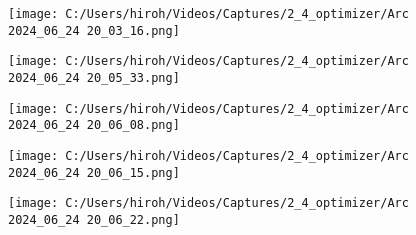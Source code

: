 \documentclass{ltjsarticle}
\begin{document}
\begin{figure}[htbp]
  \centering
  \texttt{[image: C:/Users/hiroh/Videos/Captures/2\_4\_optimizer/Arc 2024\_06\_24 20\_03\_16.png]}
\end{figure}
\begin{figure}[htbp]
  \centering
  \texttt{[image: C:/Users/hiroh/Videos/Captures/2\_4\_optimizer/Arc 2024\_06\_24 20\_05\_33.png]}
\end{figure}
\begin{figure}[htbp]
  \centering
  \texttt{[image: C:/Users/hiroh/Videos/Captures/2\_4\_optimizer/Arc 2024\_06\_24 20\_06\_08.png]}
\end{figure}
\begin{figure}[htbp]
  \centering
  \texttt{[image: C:/Users/hiroh/Videos/Captures/2\_4\_optimizer/Arc 2024\_06\_24 20\_06\_15.png]}
\end{figure}
\begin{figure}[htbp]
  \centering
  \texttt{[image: C:/Users/hiroh/Videos/Captures/2\_4\_optimizer/Arc 2024\_06\_24 20\_06\_22.png]}
\end{figure}
\end{document}
